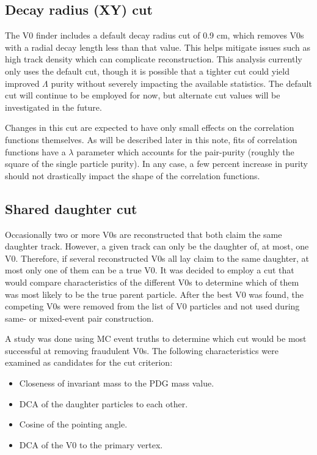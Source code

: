 \subsection{Decay radius (XY) cut}
The V0 finder includes a default decay radius cut of 0.9 cm, which removes V0s with a radial decay length less than that value.  
This helps mitigate issues such as high track density which can complicate reconstruction.  
This analysis currently only uses the default cut, though it is possible that a tighter cut could yield improved $\Lambda$ purity without severely impacting the available statistics.  
The default cut will continue to be employed for now, but alternate cut values will be investigated in the future.  

Changes in this cut are expected to have only small effects on the correlation functions themselves.  
As will be described later in this note, fits of correlation functions have a $\lambda$ parameter which accounts for the pair-purity (roughly the square of the single particle purity).  
In any case, a few percent increase in purity should not drastically impact the shape of the correlation functions.


\subsection{Shared daughter cut}

Occasionally two or more V0s are reconstructed that both claim the same daughter track.  
However, a given track can only be the daughter of, at most, one V0.  
Therefore, if several reconstructed V0s all lay claim to the same daughter, at most only one of them can be a true V0.  
It was decided to employ a cut that would compare characteristics of the different V0s to determine which of them was most likely to be the true parent particle.  
After the best V0 was found, the competing V0s were removed from the list of V0 particles and not used during same- or mixed-event pair construction.

A study was done using MC event truths to determine which cut would be most successful at removing fraudulent V0s.  
The following characteristics were examined as candidates for the cut criterion:

\begin{itemize}
\item Closeness of invariant mass to the PDG mass value.
\item DCA of the daughter particles to each other.
\item Cosine of the pointing angle.
\item DCA of the V0 to the primary vertex.
\end{itemize}

